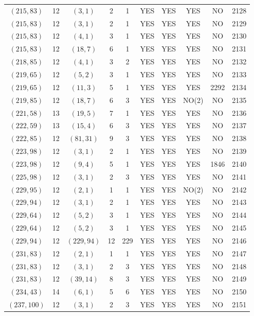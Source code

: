 \begin{longtable}{|c|c|c|c|c|c|c|c|c|c|}
$(215, 83)$ & 12 & $(3, 1)$ & 2 & 1 & YES & YES & YES & NO & 2128\\
$(215, 83)$ & 12 & $(3, 1)$ & 2 & 1 & YES & YES & YES & NO & 2129\\
$(215, 83)$ & 12 & $(4, 1)$ & 3 & 1 & YES & YES & YES & NO & 2130\\
$(215, 83)$ & 12 & $(18, 7)$ & 6 & 1 & YES & YES & YES & NO & 2131\\
$(218, 85)$ & 12 & $(4, 1)$ & 3 & 2 & YES & YES & YES & NO & 2132\\
$(219, 65)$ & 12 & $(5, 2)$ & 3 & 1 & YES & YES & YES & NO & 2133\\
$(219, 65)$ & 12 & $(11, 3)$ & 5 & 1 & YES & YES & YES & 2292 & 2134\\
$(219, 85)$ & 12 & $(18, 7)$ & 6 & 3 & YES & YES & NO(2) & NO & 2135\\
$(221, 58)$ & 13 & $(19, 5)$ & 7 & 1 & YES & YES & YES & NO & 2136\\
$(222, 59)$ & 13 & $(15, 4)$ & 6 & 3 & YES & YES & YES & NO & 2137\\
$(222, 85)$ & 12 & $(81, 31)$ & 9 & 3 & YES & YES & YES & NO & 2138\\
$(223, 98)$ & 12 & $(3, 1)$ & 2 & 1 & YES & YES & YES & NO & 2139\\
$(223, 98)$ & 12 & $(9, 4)$ & 5 & 1 & YES & YES & YES & 1846 & 2140\\
$(225, 98)$ & 12 & $(3, 1)$ & 2 & 3 & YES & YES & YES & NO & 2141\\
$(229, 95)$ & 12 & $(2, 1)$ & 1 & 1 & YES & YES & NO(2) & NO & 2142\\
$(229, 94)$ & 12 & $(3, 1)$ & 2 & 1 & YES & YES & YES & NO & 2143\\
$(229, 64)$ & 12 & $(5, 2)$ & 3 & 1 & YES & YES & YES & NO & 2144\\
$(229, 64)$ & 12 & $(5, 2)$ & 3 & 1 & YES & YES & YES & NO & 2145\\
$(229, 94)$ & 12 & $(229, 94)$ & 12 & 229 & YES & YES & YES & NO & 2146\\
$(231, 83)$ & 12 & $(2, 1)$ & 1 & 1 & YES & YES & YES & NO & 2147\\
$(231, 83)$ & 12 & $(3, 1)$ & 2 & 3 & YES & YES & YES & NO & 2148\\
$(231, 83)$ & 12 & $(39, 14)$ & 8 & 3 & YES & YES & YES & NO & 2149\\
$(234, 43)$ & 14 & $(6, 1)$ & 5 & 6 & YES & YES & YES & NO & 2150\\
$(237, 100)$ & 12 & $(3, 1)$ & 2 & 3 & YES & YES & YES & NO & 2151\\

\end{longtable}
